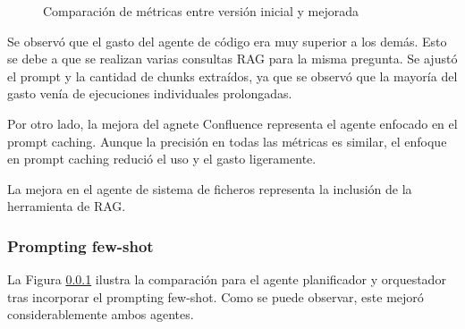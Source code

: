 \begin{figure}[hbtp]
\vspace{-0.2cm} %
\begin{center}
\end{center}

\caption{Comparación de métricas entre versión inicial y mejorada}
\label{fig:comparacion_metricas}
\end{figure}
\vspace{-0.2cm} 

Se observó que el gasto del agente de código era muy superior a los demás. Esto se debe a que se realizan varias consultas RAG para la misma pregunta. Se ajustó el prompt y la cantidad de chunks extraídos, ya que se observó que la mayoría del gasto venía de ejecuciones individuales prolongadas.

Por otro lado, la mejora del agnete Confluence representa el agente enfocado en el prompt caching. Aunque la precisión en todas las métricas es similar, el enfoque en prompt caching redució el uso y el gasto ligeramente. 

La mejora en el agente de sistema de ficheros representa la inclusión de la herramienta de RAG. 

\subsubsection{Prompting few-shot}
La Figura \ref{} ilustra la comparación para el agente planificador y orquestador tras incorporar el prompting few-shot. Como se puede observar, este mejoró considerablemente ambos agentes.



